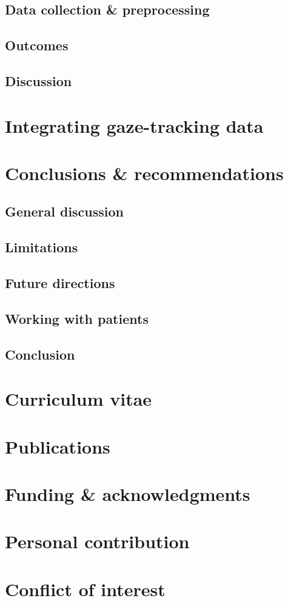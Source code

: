 \documentclass[draft]{book}
\begin{document}
\section{Data collection \& preprocessing}
\section{Outcomes}
\section{Discussion}

\chapter{Integrating gaze-tracking data}

\chapter{Conclusions \& recommendations}
\section{General discussion}
\section{Limitations}
\section{Future directions}
\section{Working with patients}
\section{Conclusion}



\appendix
\backmatter
\chapter{Curriculum vitae}
\chapter{Publications}
\chapter{Funding \& acknowledgments}
\lipsum[1]
\chapter{Personal contribution}
\lipsum[2]
\chapter{Conflict of interest}
\lipsum[3]
\end{document}
